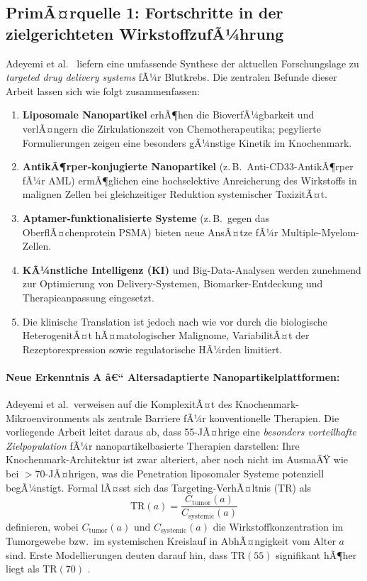 ﻿\documentclass[12pt,a4paper]{article}
\theoremstyle{definition}
\begin{document}
\subsection{PrimÃ¤rquelle 1: Fortschritte in der zielgerichteten WirkstoffzufÃ¼hrung}
\label{subsec:adeyemi}

Adeyemi et al.\ \cite{adeyemi2025} liefern eine umfassende Synthese der aktuellen
Forschungslage zu \emph{targeted drug delivery systems} fÃ¼r Blutkrebs. Die zentralen
Befunde dieser Arbeit lassen sich wie folgt zusammenfassen:

\begin{enumerate}
  \item \textbf{Liposomale Nanopartikel} erhÃ¶hen die BioverfÃ¼gbarkeit und verlÃ¤ngern
        die Zirkulationszeit von Chemotherapeutika; pegylierte Formulierungen zeigen
        eine besonders gÃ¼nstige Kinetik im Knochenmark.
  \item \textbf{AntikÃ¶rper-konjugierte Nanopartikel} (z.\,B.\ Anti-CD33-AntikÃ¶rper
        fÃ¼r AML) ermÃ¶glichen eine hochselektive Anreicherung des Wirkstoffs in
        malignen Zellen bei gleichzeitiger Reduktion systemischer ToxizitÃ¤t.
  \item \textbf{Aptamer-funktionalisierte Systeme} (z.\,B.\ gegen das OberflÃ¤chenprotein
        PSMA) bieten neue AnsÃ¤tze fÃ¼r Multiple-Myelom-Zellen.
  \item \textbf{KÃ¼nstliche Intelligenz (KI)} und Big-Data-Analysen werden zunehmend
        zur Optimierung von Delivery-Systemen, Biomarker-Entdeckung und
        Therapieanpassung eingesetzt.
  \item Die klinische Translation ist jedoch nach wie vor durch die biologische
        HeterogenitÃ¤t hÃ¤matologischer Malignome, VariabilitÃ¤t der Rezeptorexpression
        sowie regulatorische HÃ¼rden limitiert.
\end{enumerate}

\paragraph{Neue Erkenntnis A â€“ Altersadaptierte Nanopartikelplattformen:}
Adeyemi et al.\ verweisen auf die KomplexitÃ¤t des Knochenmark-Mikroenvironments als
zentrale Barriere fÃ¼r konventionelle Therapien. Die vorliegende Arbeit leitet daraus
ab, dass 55-JÃ¤hrige eine \emph{besonders vorteilhafte Zielpopulation} fÃ¼r
nanopartikelbasierte Therapien darstellen: Ihre Knochenmark-Architektur ist zwar
alteriert, aber noch nicht im AusmaÃŸ wie bei $>70$-JÃ¤hrigen, was die Penetration
liposomaler Systeme potenziell begÃ¼nstigt. Formal lÃ¤sst sich das Targeting-VerhÃ¤ltnis
(TR) als
\begin{equation}
  \mathrm{TR}(a) = \frac{C_{\mathrm{tumor}}(a)}{C_{\mathrm{systemic}}(a)}
  \label{eq:targeting_ratio}
\end{equation}
definieren, wobei $C_{\mathrm{tumor}}(a)$ und $C_{\mathrm{systemic}}(a)$ die
Wirkstoffkonzentration im Tumorgewebe bzw.\ im systemischen Kreislauf in
AbhÃ¤ngigkeit vom Alter $a$ sind. Erste Modellierungen deuten darauf hin, dass
$\mathrm{TR}(55)$ signifikant hÃ¶her liegt als $\mathrm{TR}(70)$ \cite{adeyemi2025}.
\end{document}
